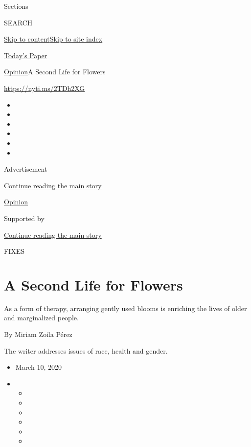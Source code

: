 Sections

SEARCH

\protect\hyperlink{site-content}{Skip to
content}\protect\hyperlink{site-index}{Skip to site index}

\href{https://myaccount.nytimes.com/auth/login?response_type=cookie\&client_id=vi}{}

\href{https://www.nytimes.com/section/todayspaper}{Today's Paper}

\href{/section/opinion}{Opinion}\textbar{}A Second Life for Flowers

\href{https://nyti.ms/2TDh2XG}{https://nyti.ms/2TDh2XG}

\begin{itemize}
\item
\item
\item
\item
\item
\item
\end{itemize}

Advertisement

\protect\hyperlink{after-top}{Continue reading the main story}

\href{/section/opinion}{Opinion}

Supported by

\protect\hyperlink{after-sponsor}{Continue reading the main story}

FIXES

\hypertarget{a-second-life-for-flowers}{%
\section{A Second Life for Flowers}\label{a-second-life-for-flowers}}

As a form of therapy, arranging gently used blooms is enriching the
lives of older and marginalized people.

By Miriam Zoila Pérez

The writer addresses issues of race, health and gender.

\begin{itemize}
\item
  March 10, 2020
\item
  \begin{itemize}
  \item
  \item
  \item
  \item
  \item
  \item
  \end{itemize}
\end{itemize}


